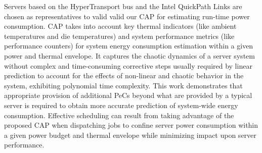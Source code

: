 Servers based on the HyperTransport bus \cite{HT2008} and the Intel
QuickPath Links \cite{Intel2009} are chosen as representatives to valid
valid our CAP for estimating run-time power consumption.  CAP takes into
account key thermal indicators (like ambient temperatures and die
temperatures) and system performance metrics (like performance counters)
for system energy consumption estimation within a given power and
thermal envelope.  It captures the chaotic dynamics of a server system
without complex and time-consuming corrective steps usually required by
linear prediction to account for the effects of non-linear and chaotic
behavior in the system, exhibiting polynomial time complexity.  This
work demonstrates that appropriate provision of additional PeCs beyond
what are provided by a typical server is required to obtain more
accurate prediction of system-wide energy consumption.  Effective
scheduling can result from taking advantage of the proposed CAP when
dispatching jobs to confine server power consumption within a given
power budget and thermal envelope while minimizing impact upon server
performance.

